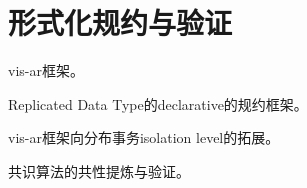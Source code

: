 \chapter{形式化规约与验证}

\begin{theorem}
    
    vis-ar框架。
    
    Replicated Data Type的declarative的规约框架。
    
\end{theorem}

\begin{theorem}
    
    vis-ar框架向分布事务isolation level的拓展。
    
\end{theorem}

\begin{theorem}
    
    共识算法的共性提炼与验证。
    
\end{theorem}
